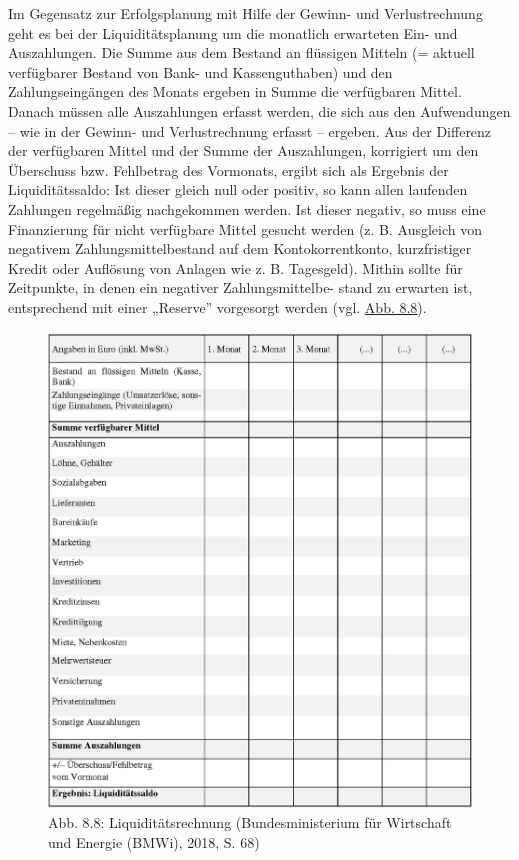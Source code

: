 \documentclass[
  letterpaper,
]{book}
\begin{document}
Im Gegensatz zur Erfolgsplanung mit Hilfe der Gewinn- und
Verlustrechnung geht es bei der Liquiditätsplanung um die monatlich
erwarteten Ein- und Auszahlungen. Die Summe aus dem Bestand an flüssigen
Mitteln (= aktuell verfügbarer Bestand von Bank- und Kassenguthaben) und
den Zahlungseingängen des Monats ergeben in Summe die verfügbaren
Mittel. Danach müssen alle Auszahlungen erfasst werden, die sich aus den
Aufwendungen -- wie in der Gewinn- und Verlustrechnung erfasst --
ergeben. Aus der Differenz der verfügbaren Mittel und der Summe der
Auszahlungen, korrigiert um den Überschuss bzw. Fehlbetrag des
Vormonats, ergibt sich als Ergebnis der Liquiditätssaldo: Ist dieser
gleich null oder positiv, so kann allen laufenden Zahlungen regelmäßig
nachgekommen werden. Ist dieser negativ, so muss eine Finanzierung für
nicht verfügbare Mittel gesucht werden (z. B. Ausgleich von negativem
Zahlungsmittelbestand auf dem Kontokorrentkonto, kurzfristiger Kredit
oder Auflösung von Anlagen wie z. B. Tagesgeld). Mithin sollte für
Zeitpunkte, in denen ein negativer Zahlungsmittelbe- stand zu erwarten
ist, entsprechend mit einer „Reserve'' vorgesorgt werden (vgl.
\hyperref[figure88]{Abb. 8.8}).

\begin{figure}

\includegraphics[width=0.75\linewidth,height=\textheight,keepaspectratio]{images/figure88.png} \hfill{}

\caption{Abb. 8.8: Liquiditätsrechnung (Bundesministerium für Wirtschaft
und Energie (BMWi), 2018, S. 68)}

\end{figure}%
\end{document}
